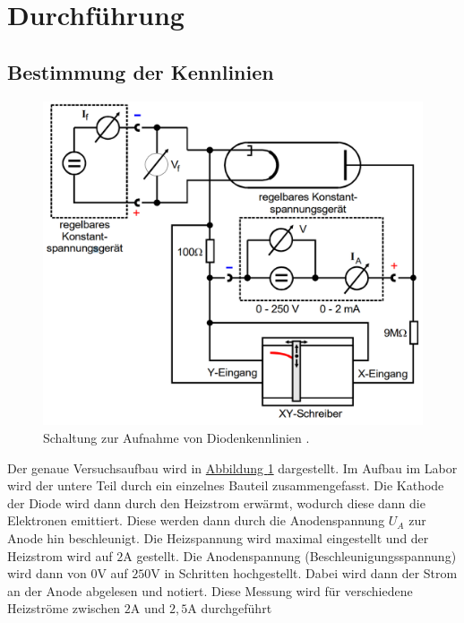\section{Durchführung}
\label{sec:Durchführung}

\subsection{Bestimmung der Kennlinien}
\label{sec:Kennlinien}

\begin{figure}
    \centering
    \includegraphics[width=\textwidth]{pictures/Aufbau.pdf}
    \caption{Schaltung zur Aufnahme von Diodenkennlinien \cite{v504}.}
    \label{fig:Aufbau}
\end{figure}

Der genaue Versuchsaufbau wird in \hyperref[fig:Aufbau]{Abbildung \ref{fig:Aufbau}} dargestellt.
Im Aufbau im Labor wird der untere Teil durch ein einzelnes Bauteil zusammengefasst.
Die Kathode der Diode wird dann durch den Heizstrom erwärmt, wodurch diese dann die Elektronen emittiert.
Diese werden dann durch die Anodenspannung $U_A$ zur Anode hin beschleunigt.
Die Heizspannung wird maximal eingestellt und der Heizstrom wird auf $2 \unit\ampere$ gestellt.
Die Anodenspannung (Beschleunigungsspannung) wird dann von $0 \unit\volt$ auf $250 \unit\volt$ in Schritten hochgestellt.
Dabei wird dann der Strom an der Anode abgelesen und notiert.
Diese Messung wird für verschiedene Heizströme zwischen $2 \unit\ampere$ und $2,5 \unit\ampere$ durchgeführt

